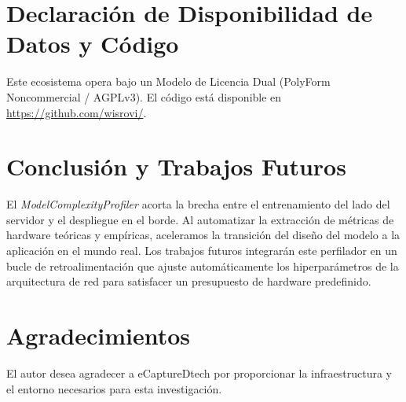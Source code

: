 \documentclass[conference]{IEEEtran}
\begin{document}
\section{Declaración de Disponibilidad de Datos y Código}
Este ecosistema opera bajo un Modelo de Licencia Dual (PolyForm Noncommercial / AGPLv3). 
El código está disponible en \url{https://github.com/wisrovi/}.

\section{Conclusión y Trabajos Futuros}
El \textit{ModelComplexityProfiler} acorta la brecha entre el entrenamiento del lado del servidor y el despliegue en el borde. Al automatizar la extracción de métricas de hardware teóricas y empíricas, aceleramos la transición del diseño del modelo a la aplicación en el mundo real. Los trabajos futuros integrarán este perfilador en un bucle de retroalimentación que ajuste automáticamente los hiperparámetros de la arquitectura de red para satisfacer un presupuesto de hardware predefinido.

\section*{Agradecimientos}
El autor desea agradecer a eCaptureDtech por proporcionar la infraestructura y el entorno necesarios para esta investigación.



\end{document}
